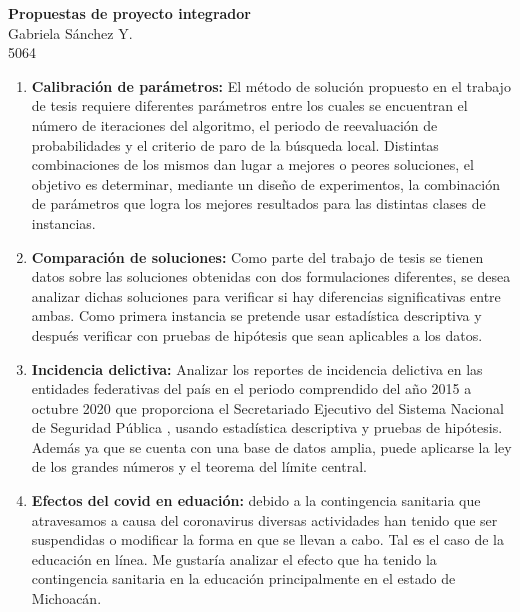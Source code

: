 \documentclass[12pt]{article}
\begin{document}
	\thispagestyle{empty}

	\begin{center}
		{\Large \bf Propuestas de proyecto integrador}\\
		Gabriela S\'anchez Y.\\
		5064
	\end{center}
  
  	\begin{enumerate}
  		\item {\bf Calibración de parámetros:} El método de solución propuesto en el trabajo de tesis requiere diferentes parámetros entre los cuales se encuentran el número de iteraciones del algoritmo, el periodo de reevaluación de probabilidades y el criterio de paro de la búsqueda local. Distintas combinaciones de los mismos dan lugar a mejores o peores soluciones, el objetivo es determinar, mediante un diseño de experimentos, la combinación de parámetros que logra los mejores resultados para las distintas clases de instancias.
  		\item {\bf Comparación de soluciones:} Como parte del trabajo de tesis se tienen datos sobre las soluciones obtenidas con dos formulaciones diferentes, se desea analizar dichas soluciones para verificar si hay diferencias significativas entre ambas. Como primera instancia se pretende usar estadística descriptiva y después verificar con pruebas de hipótesis que sean aplicables a los datos.
  		\item {\bf Incidencia delictiva:} Analizar los reportes de incidencia delictiva en las entidades federativas del país en el periodo comprendido del año 2015 a octubre 2020 que proporciona el Secretariado Ejecutivo del Sistema Nacional de Seguridad Pública \cite{sesnsp}, usando estadística descriptiva y pruebas de hipótesis. Además ya que se cuenta con una base de datos amplia, puede aplicarse la ley de los grandes números y el teorema del límite central.
  		\item {\bf Efectos del covid en eduación:} debido a la contingencia sanitaria que atravesamos a causa del coronavirus diversas actividades han tenido que ser suspendidas o modificar la forma en que se llevan a cabo. Tal es el caso de la educación en línea. Me gustaría analizar el efecto que ha tenido la contingencia sanitaria en la educación principalmente en el estado de Michoacán.
  	\end{enumerate}
	


\end{document}
